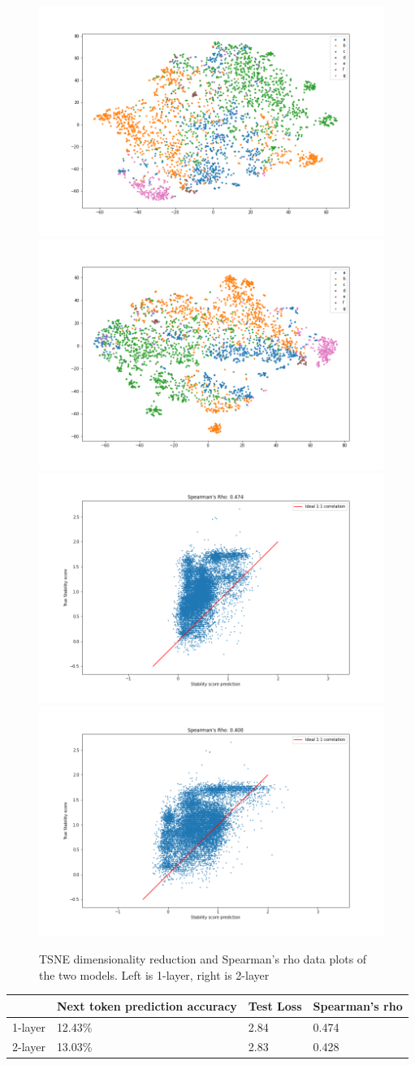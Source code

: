 \begin{figure}[!ht]
  \centering
  \includegraphics[width=0.49\linewidth]{latex/imgs/tsne_1_layer_with_schedule_512_final.png}
  \includegraphics[width=0.49\linewidth]{latex/imgs/tsne_2_layer_no_drop_final.png}
  \includegraphics[width=0.49\linewidth]{latex/imgs/spearman_1_layer_with_schedule_512_final.png}
  \includegraphics[width=0.49\linewidth]{latex/imgs/spearman_2_layer_no_drop_final.png}
  \caption{TSNE dimensionality reduction  and Spearman's rho data plots of the two models. Left is 1-layer, right is 2-layer}
\end{figure}

\begin{table}[!ht]
\begin{tabular}{|l|l|l|l|}
\hline
        & Next token prediction accuracy & Test Loss & Spearman's rho\\ \hline
1-layer & 12.43\%                        & 2.84      & 0.474         \\ \hline
2-layer & 13.03\%                        & 2.83      & 0.428         \\ \hline
\end{tabular}
\end{table}